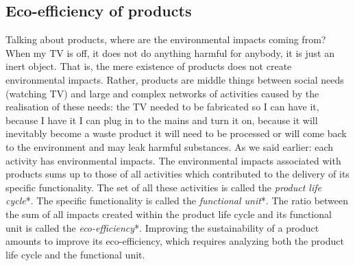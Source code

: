 \documentclass{article}
\begin{document}
\subsection{Eco-efficiency of products}
\label{sec:tbd}

Talking about products, where are the environmental impacts coming from? When my TV is off, it does not do anything harmful for anybody, it is just an inert object. That is, the mere existence of products does not create environmental impacts. Rather, products are middle things between social needs (watching TV) and large and complex networks of activities caused by the realisation of these needs: the TV needed to be fabricated so I can have it, because I have it I can plug in to the mains and turn it on, because it will inevitably become a waste product it will need to be processed or will come back to the environment and may leak harmful substances. As we said earlier: each activity has environmental impacts. The environmental impacts associated with products sums up to those of all activities which contributed to the delivery of its specific functionality. The set of all these activities is called the \emph{product life cycle}*. The specific functionality is called the \emph{functional unit}*. The ratio between the sum of all impacts created within the product life cycle and its functional unit is called the \emph{eco-efficiency}*. Improving the sustainability of a product amounts to improve its eco-efficiency, which requires analyzing both the product life cycle and the functional unit.
\end{document}
